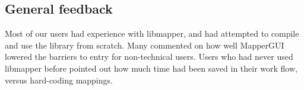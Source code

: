 

%


	\subsection{General feedback} %
	\label{sub:general_feedback}

Most of our users had experience with libmapper, and had attempted to compile and use the library from scratch. Many commented on how well MapperGUI lowered the barriers to entry for non-technical users. Users who had never used libmapper before pointed out how much time had been saved in their work flow, versus hard-coding mappings.

